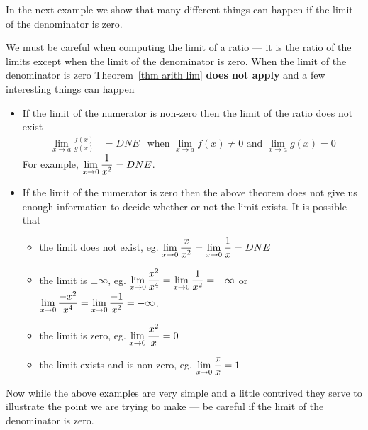 In the next example we show that many different things can happen if
the limit of the denominator is zero.
\begin{eg}\label{eg lim rat}
We must be careful when computing the limit of a ratio --- it
is the ratio of the limits except when the limit of the denominator is zero.
When the limit of the denominator is zero Theorem~\ref{thm arith lim}
\textbf{does not apply} and a few interesting things can happen
\begin{itemize}
 \item If the limit of the numerator is non-zero then the limit of the ratio
does not exist
\begin{align*}
  \lim_{x \to a} \frac{f(x)}{g(x)} &= DNE & \text{when $\lim_{x\to a} f(x) \neq
0$ and $\lim_{x \to a} g(x)=0$}
\end{align*}
  For example, $\displaystyle \lim_{x \to 0} \frac{1}{x^2} = DNE$.
 \item If the limit of the numerator is zero then the above theorem does not
give us enough information to decide whether or not the limit exists. It is
possible that
\begin{itemize}
 \item the limit does not exist, eg. $\displaystyle \lim_{x \to 0} \frac{x}{x^2} =
\lim_{x
\to 0} \frac{1}{x} = DNE$
 \item the limit is $\pm \infty$, eg. $\displaystyle \lim_{x \to 0} \frac{x^2}{x^4} =
\lim_{x
\to 0} \frac{1}{x^2} = +\infty$ or $\displaystyle \lim_{x \to 0} \frac{-x^2}{x^4} =
\lim_{x\to 0} \frac{-1}{x^2} = -\infty$.
 \item the limit is zero, eg. $\displaystyle \lim_{x \to 0} \frac{x^2}{x} = 0$
 \item the limit exists and is non-zero, eg. $\displaystyle \lim_{x \to 0} \frac{x}{x} =
1$
\end{itemize}
\end{itemize}
Now while the above examples are very simple and a little contrived they serve
to illustrate the point we are trying to make --- be careful if the limit of
the denominator is zero.
\end{eg}



